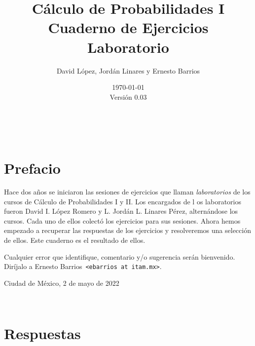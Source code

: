 \documentclass[11pt]{article}
\newcommand{\raiz}{../..}
\newcommand{\home}{\raiz/CP1/}
\def\version{0.03}
\begin{document}

\title{\bf {
		\huge Cálculo de Probabilidades I \\[1ex] 
		\LARGE Cuaderno de Ejercicios \\[1ex]
		\Large Laboratorio
		} }
\author{\large David López, Jordán Linares y Ernesto Barrios}
\date{\today \\[1ex] \small Versión \version}

\maketitle

\tableofcontents

\clearpage \newpage \

\section*{Prefacio}

Hace dos años se iniciaron las sesiones de ejercicios que llaman \emph{laboratorios} de los cursos de Cálculo de Probabilidades I y II. Los encargados de l
os laboratorios fueron David I. López Romero y L. Jordán L. Linares Pérez, alternándose los cursos. Cada uno de ellos colectó los ejercicios para sus sesiones. Ahora hemos empezado a recuperar las respuestas de los ejercicios y resolveremos una selección de ellos. Este cuaderno es el resultado de ellos.

\medskip

\noindent Cualquier error que identifique, comentario y/o sugerencia serán bienvenido. Diríjalo a Ernesto Barrios\ \texttt{<ebarrios at itam.mx>}.

\bigskip

\begin{flushright}Ciudad de México, 2 de mayo de 2022 \end{flushright}

\newpage 


\newpage

\newpage





\clearpage \newpage \

\renewcommand{\thesubsection}{\arabic{subsection}}
\section*{Respuestas}

\renewcommand{\theenumi}{\thesubsection:\arabic{enumi}}




\end{document}
